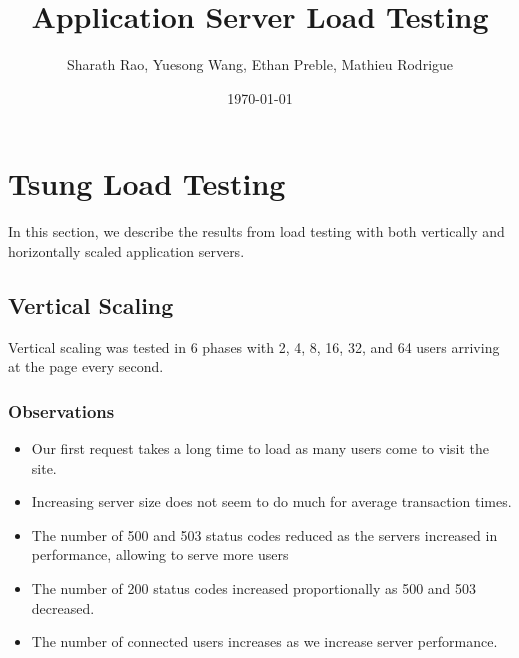 \documentclass[dvips,12pt]{article}
\begin{document}
\title{Application Server Load Testing}
\author{Sharath Rao, Yuesong Wang, Ethan Preble, Mathieu Rodrigue}
\date{\today}

\maketitle

%

\section{Tsung Load Testing}

In this section, we describe the results from load testing with both vertically and horizontally scaled application servers.

\subsection{Vertical Scaling}

Vertical scaling was tested in 6 phases with 2, 4, 8, 16, 32, and 64 users arriving at the page every second.

\subsubsection{Observations}

\begin{itemize}
  \item Our first request takes a long time to load as many users come to visit the site.
  \item Increasing server size does not seem to do much for average transaction times.
  \item The number of 500 and 503 status codes reduced as the servers increased in performance, allowing to serve more users
  \item The number of 200 status codes increased proportionally as 500 and 503 decreased.
  \item The number of connected users increases as we increase server performance.
\end{itemize}
\newpage
\end{document}
